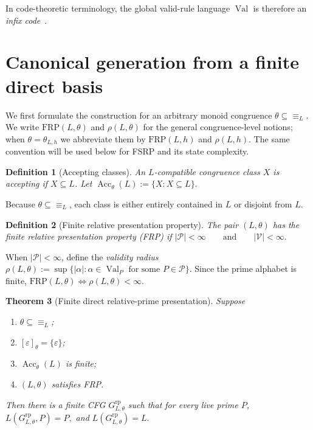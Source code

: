 \documentclass[11pt,a4paper]{article}
\newtheorem{theorem}{Theorem}[section]
\newtheorem{definition}[theorem]{Definition}
\newcommand{\eps}{\varepsilon}
\newcommand{\Pcal}{\mathcal P}
\newcommand{\Vcal}{\mathcal V}
\newcommand{\Val}{\operatorname{Val}}
\newcommand{\Acc}{\operatorname{Acc}}
\begin{document}
In code-theoretic terminology, the global valid-rule language $\Val$ is therefore an \emph{infix code}~\cite{ItoJurgensenShyrThierrin1991}.

\section{Canonical generation from a finite direct basis}

We first formulate the construction for an arbitrary monoid congruence $\theta\subseteq\equiv_L$.  We write $\mathrm{FRP}(L,\theta)$ and $\rho(L,\theta)$ for the general congruence-level notions; when $\theta=\theta_{L,h}$ we abbreviate them by $\mathrm{FRP}(L,h)$ and $\rho(L,h)$.  The same convention will be used below for FSRP and its state complexity.

\begin{definition}[Accepting classes]
An $L$-compatible congruence class $X$ is \emph{accepting} if $X\subseteq L$.  Let
\(\Acc_\theta(L):=\{X:X\subseteq L\}.\)
\end{definition}

Because $\theta\subseteq\equiv_L$, each class is either entirely contained in $L$ or disjoint from $L$.

\begin{definition}[Finite relative presentation property]
The pair $(L,\theta)$ has the \emph{finite relative presentation property} (FRP) if
\(|\Pcal|<\infty \qquad\text{and}\qquad |\Vcal|<\infty.\)
\end{definition}

When $|\Pcal|<\infty$, define the \emph{validity radius}
\(\rho(L,\theta):=\sup\{|\alpha|:\alpha\in\Val_P\text{ for some }P\in\Pcal\}.\)
Since the prime alphabet is finite, $\mathrm{FRP}(L,\theta)\iff\rho(L,\theta)<\infty$.

\begin{theorem}[Finite direct relative-prime presentation]
\label{thm:direct-presentation}
Suppose
\begin{enumerate}[label=(\roman*)]
\item $\theta\subseteq\equiv_L$;
\item $[\eps]_\theta=\{\eps\}$;
\item $\Acc_\theta(L)$ is finite;
\item $(L,\theta)$ satisfies FRP.
\end{enumerate}
Then there is a finite CFG $G^{\mathrm{rp}}_{L,\theta}$ such that for every live prime $P$,
\(L(G^{\mathrm{rp}}_{L,\theta},P)=P,\)
and
\(L(G^{\mathrm{rp}}_{L,\theta})=L.\)
\end{theorem}
\end{document}
